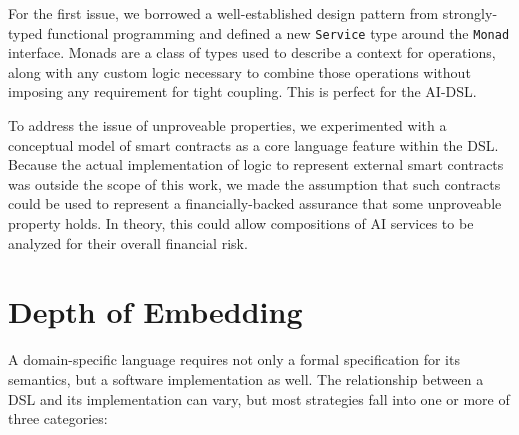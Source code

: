 \documentclass[]{report}
\begin{document}
For the first issue, we borrowed a well-established design pattern from
strongly-typed functional programming and defined a new \texttt{Service} type
around the \texttt{Monad} interface.  Monads are a class of types used to
describe a context for operations, along with any custom logic necessary to
combine those operations without imposing any requirement for tight coupling.
This is perfect for the AI-DSL.

To address the issue of unproveable properties, we experimented with a
conceptual model of smart contracts as a core language feature within the DSL.
Because the actual implementation of logic to represent external smart contracts
was outside the scope of this work, we made the assumption that such contracts
could be used to represent a financially-backed assurance that some unproveable
property holds.  In theory, this could allow compositions of AI services to be
analyzed for their overall financial risk.



\section{Depth of Embedding}

A domain-specific language requires not only a formal specification for its
semantics, but a software implementation as well.  The relationship between a
DSL and its implementation can vary, but most strategies fall into one or more
of three categories:
\end{document}
